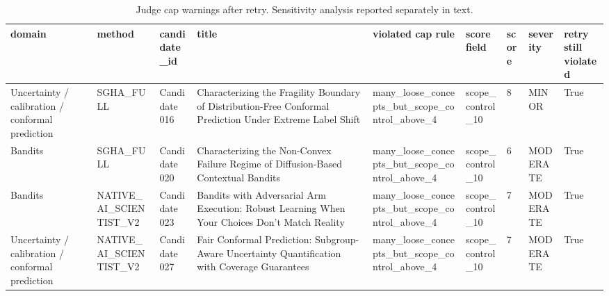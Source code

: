 \begin{table}[htbp]
\centering
\caption{Judge cap warnings after retry. Sensitivity analysis reported separately in text.}
\label{tab:cap\_warnings}
\begin{tabular}{lllllllll}
\toprule
domain & method & candidate\_id & title & violated cap rule & score field & score & severity & retry still violated \\
\midrule
Uncertainty / calibration / conformal prediction & SGHA\_FULL & Candidate 016 & Characterizing the Fragility Boundary of Distribution-Free Conformal Prediction Under Extreme Label Shift & many\_loose\_concepts\_but\_scope\_control\_above\_4 & scope\_control\_10 & 8 & MINOR & True \\
Bandits & SGHA\_FULL & Candidate 020 & Characterizing the Non-Convex Failure Regime of Diffusion-Based Contextual Bandits & many\_loose\_concepts\_but\_scope\_control\_above\_4 & scope\_control\_10 & 6 & MODERATE & True \\
Bandits & NATIVE\_AI\_SCIENTIST\_V2 & Candidate 023 & Bandits with Adversarial Arm Execution: Robust Learning When Your Choices Don't Match Reality & many\_loose\_concepts\_but\_scope\_control\_above\_4 & scope\_control\_10 & 7 & MODERATE & True \\
Uncertainty / calibration / conformal prediction & NATIVE\_AI\_SCIENTIST\_V2 & Candidate 027 & Fair Conformal Prediction: Subgroup-Aware Uncertainty Quantification with Coverage Guarantees & many\_loose\_concepts\_but\_scope\_control\_above\_4 & scope\_control\_10 & 7 & MODERATE & True \\
\bottomrule
\end{tabular}
\end{table}
